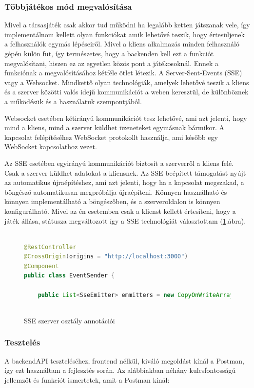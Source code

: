 \documentclass[a4paper,twoside]{article}
\begin{document}
\subsubsection{Többjátékos mód megvalósítása}
Mivel a társasjáték csak akkor tud működni ha legalább ketten játszanak vele, így implementálnom kellett olyan funkciókat amik lehetővé teszik, hogy értesüljenek 
a felhasználók egymás lépéseiről. Mivel a kliens alkalmazás minden felhasználó gépén külön fut, így természetes, hogy a backenden kell ezt a funkciót megvalósítani, hiszen ez az egyetlen közös pont a játékosoknál. Ennek a funkciónak a megvalósításához kétféle ötlet létezik. A Server-Sent-Events (SSE) vagy a Websocket. Mindkettő olyan technológiák, amelyek lehetővé teszik a kliens és a szerver közötti valós idejű kommunikációt a weben keresztül, de különböznek a működésük és a használatuk szempontjából.

Websocket esetében kétirányú kommunikációt tesz lehetővé, ami azt jelenti, hogy mind a kliens, mind a szerver küldhet üzeneteket egymásnak bármikor. A kapcsolat felépítéséhez WebSocket protokollt használja, ami később egy WebSocket kapcsolathoz vezet.
 
Az SSE esetében egyirányú kommunikációt biztosít a szerverről a kliens felé. Csak a szerver küldhet adatokat a kliensnek. Az SSE beépített támogatást nyújt az automatikus újraépítéshez, ami azt jelenti, hogy ha a kapcsolat megszakad, a böngésző automatikusan megpróbálja újraépíteni. Könnyen használható és könnyen implementálható a böngészőben, és a szerveroldalon is könnyen konfigurálható. Mivel az én esetemben csak a klienst kellett értesíteni, hogy a játék állása, státusza megváltozott így a SSE technológiát választottam (\ref{sse}.ábra). 
\begin{figure}
	\caption{SSE szerver osztály annotációi}
	\centering
	\begin{lstlisting}[language=java,breaklines=true]
		
@RestController
@CrossOrigin(origins = "http://localhost:3000")
@Component
public class EventSender {
		
	public List<SseEmitter> emmitters = new CopyOnWriteArrayList<SseEmitter>();
		
	\end{lstlisting}
	\label{sse}
\end{figure} 
\subsubsection{Tesztelés}
A backendAPI teszteléséhez, frontend nélkül, kiváló megoldást kínál a Postman\cite{postman}, így ezt használtam a fejlesztés során. Az alábbiakban néhány kulcsfontosságú jellemzőt és funkciót ismertetek, amit a Postman kínál:
\end{document}
